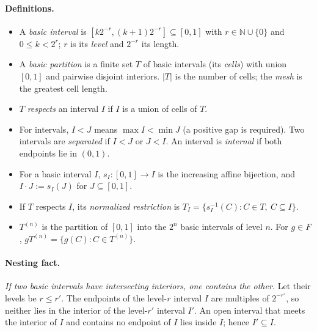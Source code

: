 \documentclass[11pt]{article}
\newcommand{\N}{\mathbb N}
\theoremstyle{definition}
\numberwithin{equation}{section}
\begin{document}
\paragraph{Definitions.}
\begin{itemize}
\item A \emph{basic interval} is
\([k2^{-r},(k+1)2^{-r}]\subseteq[0,1]\) with \(r\in\N\cup\{0\}\) and
\(0\le k<2^r\); \(r\) is its \emph{level} and \(2^{-r}\) its length.
\item A \emph{basic partition} is a finite set \(T\) of basic intervals
(its \emph{cells}) with union \([0,1]\) and pairwise disjoint interiors.
\(|T|\) is the number of cells; the \emph{mesh} is the greatest cell length.
\item \(T\) \emph{respects} an interval \(I\) if \(I\) is a union of cells of
\(T\).
\item For intervals, \(I<J\) means \(\max I<\min J\) (a positive gap is
required). Two intervals are \emph{separated} if \(I<J\) or \(J<I\). An
interval is \emph{internal} if both endpoints lie in \((0,1)\).
\item For a basic interval \(I\), \(s_I:[0,1]\to I\) is the increasing affine
bijection, and \(I\cdot J:=s_I(J)\) for \(J\subseteq[0,1]\).
\item If \(T\) respects \(I\), its \emph{normalized restriction} is
\(T_I=\{s_I^{-1}(C):C\in T,\ C\subseteq I\}\).
\item \(T^{(n)}\) is the partition of \([0,1]\) into the \(2^n\) basic
intervals of level \(n\). For \(g\in F\),
\(gT^{(n)}=\{g(C):C\in T^{(n)}\}\).
\end{itemize}

\paragraph{Nesting fact.}
\emph{If two basic intervals have intersecting interiors, one contains the
other.} Let their levels be \(r\le r'\). The endpoints of the level-\(r\)
interval \(I\) are multiples of \(2^{-r'}\), so neither lies in the interior
of the level-\(r'\) interval \(I'\). An open interval that meets the interior
of \(I\) and contains no endpoint of \(I\) lies inside \(I\); hence
\(I'\subseteq I\).
\end{document}
